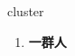 
\begin{frame}
{\huge cluster}
\begin{center}
\begin{enumerate}\Large
  \item \textbf{一群人}
\end{enumerate}
\end{center}
\end{frame}
